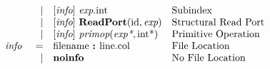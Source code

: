 \documentclass[12pt]{article}
\begin{document}
\[\begin{array}{rrll}
                &\vert &[\text{\em info}]\  \text{\em exp}.\text{int}                                                         &\text{Subindex}\\
                &\vert &[\text{\em info}]\  \text{\bf ReadPort}(\text{id}, \text{\em exp})                                         &\text{Structural Read Port}\\
                &\vert &[\text{\em info}]\  \text{\em primop}(\text{\em exp*}, \text{int}\text{*})                                 &\text{Primitive Operation}\\
\text{\em info\ }       &=     &\text{filename } \text{\bf :\ } \text{line} . \text{col}                              &\text{File Location}\\
                &\vert &\text{\bf noinfo\ }                                                                   &\text{No File Location}\\
\end{array}
\]
\end{document}
